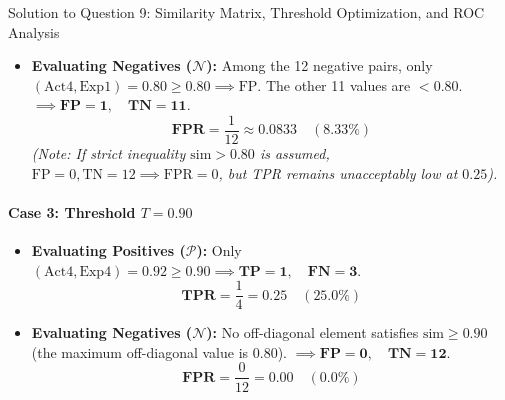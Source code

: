 \documentclass[11pt,a4paper]{article}
\begin{document}
\begin{solutionbox}{Solution to Question 9: Similarity Matrix, Threshold Optimization, and ROC Analysis}
\begin{itemize}[leftmargin=1.5em]
    \item \textbf{Evaluating Negatives ($\mathcal{N}$):}
    Among the 12 negative pairs, only $(\text{Act4}, \text{Exp1}) = 0.80 \ge 0.80 \implies \text{FP}$. The other 11 values are $< 0.80$.
    $\implies \mathbf{FP = 1}, \quad \mathbf{TN = 11}$.
    \begin{equation*}
        \mathbf{FPR} = \frac{1}{12} \approx \mathbf{0.0833} \quad (8.33\%)
    \end{equation*}
    \textit{(Note: If strict inequality $\text{sim} > 0.80$ is assumed, $\text{FP}=0, \text{TN}=12 \implies \text{FPR}=0$, but TPR remains unacceptably low at $0.25$).}
\end{itemize}

\paragraph{Case 3: Threshold $T = 0.90$}
\begin{itemize}[leftmargin=1.5em]
    \item \textbf{Evaluating Positives ($\mathcal{P}$):}
    Only $(\text{Act4}, \text{Exp4}) = 0.92 \ge 0.90 \implies \mathbf{TP = 1}, \quad \mathbf{FN = 3}$.
    \begin{equation*}
        \mathbf{TPR} = \frac{1}{4} = \mathbf{0.25} \quad (25.0\%)
    \end{equation*}
    \item \textbf{Evaluating Negatives ($\mathcal{N}$):}
    No off-diagonal element satisfies $\text{sim} \ge 0.90$ (the maximum off-diagonal value is 0.80).
    $\implies \mathbf{FP = 0}, \quad \mathbf{TN = 12}$.
    \begin{equation*}
        \mathbf{FPR} = \frac{0}{12} = \mathbf{0.00} \quad (0.0\%)
    \end{equation*}
\end{itemize}


\end{solutionbox}
\end{document}
